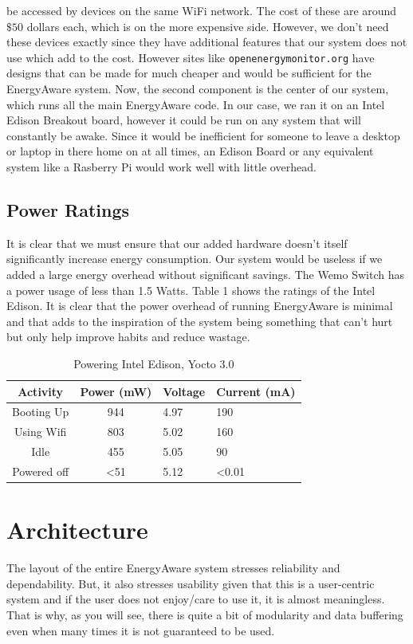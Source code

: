 \documentclass{sig-alternate-05-2015}
\begin{document}
 be accessed by devices on the same WiFi network. The cost of these are around $\$50$ dollars each, which is on the more expensive side. However, we don't need these devices exactly since they have additional features that our system does not use which add to the cost. However sites like \texttt{openenergymonitor.org} have designs that can be made for much cheaper and would be sufficient for the EnergyAware system. Now, the second component is the center of our system, which runs all the main EnergyAware code. In our case, we ran it on an Intel Edison Breakout board, however it could be run on any system that will constantly be awake. Since it would be inefficient for someone to leave a desktop or laptop in there home on at all times, an Edison Board or any equivalent system like a Rasberry Pi would work well with little overhead.

\subsection{Power Ratings}
It is clear that we must ensure that our added hardware doesn't itself significantly increase energy consumption. Our system would be useless if we added a large energy overhead without significant savings. The Wemo Switch has a power usage of less than 1.5 Watts. Table 1 shows the ratings of the Intel Edison. It is clear that the power overhead of running EnergyAware is minimal and that adds to the inspiration of the system being something that can't hurt but only help improve habits and reduce wastage.

\begin{table}
	\centering
	\caption{Powering Intel Edison, Yocto 3.0}
	\begin{tabular}{|c|c|l|l|} \hline
		Activity&Power (mW)&Voltage&Current (mA)\\ \hline
		Booting Up& 944&4.97&190\\ \hline
		Using Wifi&803&5.02&160\\ \hline
		Idle&455&5.05&90\\ \hline
		Powered off&<51&5.12&<0.01\\
		\hline\end{tabular}
\end{table}


\section{Architecture}

The layout of the entire EnergyAware system stresses reliability and dependability. But, it also stresses usability given that this is a user-centric system and if the user does not enjoy/care to use it, it is almost meaningless. That is why, as you will see, there is quite a bit of modularity and data buffering even when many times it is not guaranteed to be used.
\end{document}
